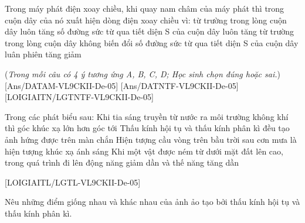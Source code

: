 \begin{ex}
	Trong máy phát điện xoay chiều, khi quay nam châm của máy phát thì trong cuộn dây của nó xuất hiện dòng điện xoay chiều vì:
	\choice
	{từ trường trong lòng cuộn dây luôn tăng}
	{số đường sức từ qua tiết diện S của cuộn dây luôn tăng}
	{từ trường trong lòng cuộn dây không biến đổi}
	{\True số đường sức từ qua tiết diện S của cuộn dây luân phiên tăng giảm}
	\loigiai{}
\end{ex}



(\textit{Trong mỗi câu có 4 ý tương ứng A, B, C, D; Học sinh chọn đúng hoặc sai.})
[Ans/DATAM-VL9CKII-De-05]
[Ans/DATNTF-VL9CKII-De-05]
\LGexTF
{}[LOIGIAITN/LGTNTF-VL9CKII-De-05]
\begin{ex}Trong các phát biểu sau:
	\choiceTF
	{\True Khi tia sáng truyền từ nước ra môi trường không khí thì góc khúc xạ lớn hơn góc tới}
	{Thấu kính hội tụ và thấu kính phân kì đều tạo ảnh hứng được trên màn chắn}
	{Hiện tượng cầu vòng trên bầu trời sau cơn mưa là hiện tượng khúc xạ ánh sáng}
	{\True Khi một vật được ném từ dưới mặt đất lên cao, trong quá trình đi lên động năng giảm dần và thế năng tăng dần}
	\loigiai{}
\end{ex}


[LOIGIAITL/LGTL-VL9CKII-De-05]
\begin{bt}[$1{,}0$ điểm]Nêu những điểm giống nhau và khác nhau của ảnh ảo tạo bởi thấu kính  hội tụ và thấu kính phân kì.
	\loigiai{}
\end{bt}

